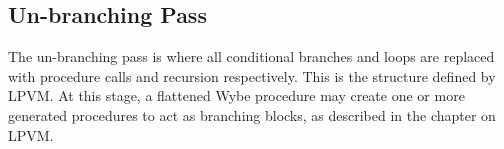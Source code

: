 \subsection{Un-branching Pass}

The un-branching pass is where all conditional branches and loops are replaced
with procedure calls and recursion respectively. This is the structure defined
by LPVM. At this stage, a flattened Wybe procedure may create one or more
generated procedures to act as branching blocks, as described in the chapter on
LPVM. 




